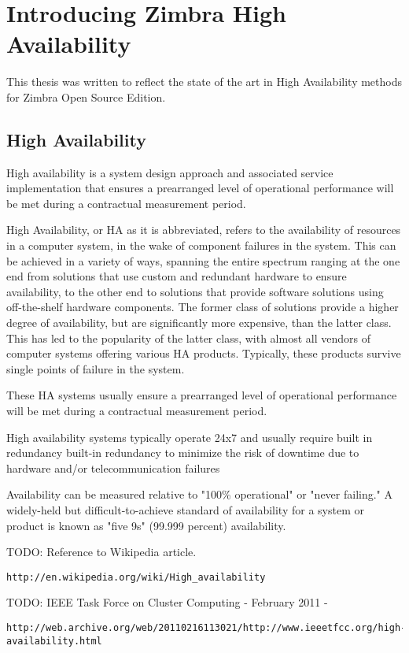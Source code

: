 

\chapter{Introducing Zimbra High Availability}
This thesis was written to reflect the state of the art in High Availability methods for Zimbra Open Source Edition.  

\section {High Availability}
High availability is a system design approach and associated service implementation that ensures a prearranged level of operational performance will be met during a contractual measurement period. 

High Availability, or HA as it is abbreviated, refers to the availability of resources in a computer system, in the wake of component failures in the system. This can be achieved in a variety of ways, spanning the entire spectrum ranging at the one end from solutions that use custom and redundant hardware to ensure availability, to the other end to solutions that provide software solutions using off-the-shelf hardware components. The former class of solutions provide a higher degree of availability, but are significantly more expensive, than the latter class. This has led to the popularity of the latter class, with almost all vendors of computer systems offering various HA products. Typically, these products survive single points of failure in the system.

These HA systems usually ensure a prearranged level of operational performance will be met during a contractual measurement period. 

High availability systems typically operate 24x7 and usually require built in redundancy built-in redundancy to minimize the risk of downtime due to hardware and/or telecommunication failures

Availability can be measured relative to "100\% operational" or "never failing." A widely-held but difficult-to-achieve standard of availability for a system or product is known as "five 9s" (99.999 percent) availability.

TODO: Reference to Wikipedia article.
\begin{verbatim}
http://en.wikipedia.org/wiki/High_availability
\end{verbatim}


TODO: IEEE Task Force on Cluster Computing - February 2011 -
\begin{verbatim}
http://web.archive.org/web/20110216113021/http://www.ieeetfcc.org/high-availability.html
\end{verbatim}

